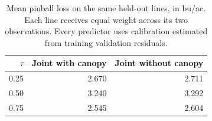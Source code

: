 \begin{table}[t]
\centering
\small
\caption{Mean pinball loss on the same held-out lines, in bu/ac. Each line receives equal weight across its two observations. Every predictor uses calibration estimated from training validation residuals.}
\label{tab:soy-prediction}
\begin{tabular}{rrr}
\toprule
$\tau$ & Joint with canopy & Joint without canopy \\
\midrule
0.25 & 2.670 & 2.711 \\
0.50 & 3.240 & 3.292 \\
0.75 & 2.545 & 2.604 \\
\bottomrule
\end{tabular}
\end{table}
